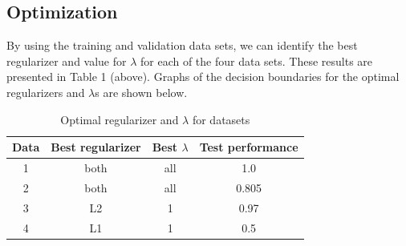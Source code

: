 \documentclass{article}
\begin{document}
\subsection{Optimization}
By using the training and validation data sets, we can identify the best regularizer and value for $\lambda$ for each of the four data sets. These results are presented in Table 1 (above). Graphs of the decision boundaries for the optimal regularizers and $\lambda$s are shown below.

\begin{table}
  \begin{center}
    \begin{tabular}{ | c | c | c | c | }
      \hline
      Data & Best regularizer & Best $\lambda$ & Test performance \\ \hline
      1       & both           & all            & 1.0 \\ \hline
      2       & both           & all            & 0.805 \\ \hline
      3       & L2               & 1             & 0.97 \\ \hline
      4       & L1               & 1             & 0.5 \\ \hline
    \end{tabular}
  \end{center}
  \caption{Optimal regularizer and $\lambda$ for datasets}
\end{table}
\end{document}
